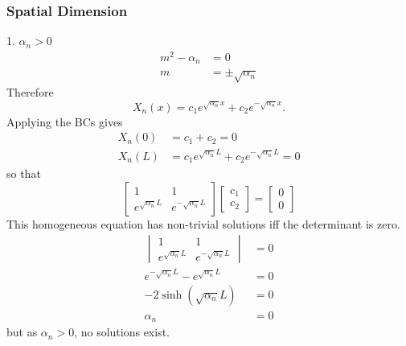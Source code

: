 \documentclass{article}
\begin{document}
\subsubsection{Spatial Dimension}
\begin{proofcase}{1. \(\alpha_n > 0\)}\let\qed\relax
    \begin{align*}
        m^2 - \alpha_n & = 0                     \\
        m              & = \pm \sqrt{ \alpha_n }
    \end{align*}
    Therefore
    \begin{equation*}
        X_n\left( x \right) = c_1 e^{\sqrt{ \alpha_n } x} + c_2 e^{-\sqrt{ \alpha_n } x}.
    \end{equation*}
    Applying the BCs gives
    \begin{align*}
        X_n\left( 0 \right) & = c_1 + c_2 = 0                                              \\
        X_n\left( L \right) & = c_1 e^{\sqrt{\alpha_n} L} + c_2 e^{-\sqrt{\alpha_n} L} = 0
    \end{align*}
    so that
    \begin{equation*}
        \begin{bmatrix*}
            1 & 1 \\
            e^{\sqrt{\alpha_n} L} & e^{-\sqrt{\alpha_n} L}
        \end{bmatrix*}
        \begin{bmatrix*}
            c_1 \\
            c_2
        \end{bmatrix*}
        =
        \begin{bmatrix*}
            0 \\
            0
        \end{bmatrix*}
    \end{equation*}
    This homogeneous equation has non-trivial solutions iff the determinant is zero.
    \begin{align*}
        \begin{vmatrix*}
            1 & 1 \\
            e^{\sqrt{\alpha_n} L} & e^{-\sqrt{\alpha_n} L}
        \end{vmatrix*} & = 0        \\
        e^{-\sqrt{\alpha_n} L} - e^{\sqrt{\alpha_n} L}                 & = 0 \\
        -2\sinh{\left( \sqrt{\alpha_n} L \right)}                      & = 0 \\
        \alpha_n                                                       & = 0
    \end{align*}
    but as \(\alpha_n > 0\), no solutions exist.
\end{proofcase}
\end{document}
